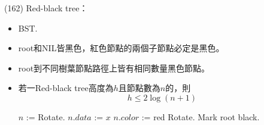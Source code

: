 \item \begin{theorem}{(162)} Red-black tree： \label{rbt}\begin{itemize}
        \item BST.
        \item root和NIL皆黑色，紅色節點的兩個子節點必定是黑色。
        \item root到不同樹葉節點路徑上皆有相同數量黑色節點。
        \item 若一Red-black tree高度為$h$且節點數為$n$的，則\begin{equation}
            h \le 2\log (n + 1)
        \end{equation}
        \begin{algorithm}[H]
            \begin{algorithmic}[1]
                    \State $n$ :=  
                        \State Rotate. 
                    \EndWhile
                    \State $n.data$ := $x$
                    \State $n.color$ := red
                        \State Rotate.
                    \EndWhile
                        \State Mark root black.
                    \EndIf
                \EndFunction
            \end{algorithmic}
        \end{algorithm}
    \end{itemize}
\end{theorem}
    
